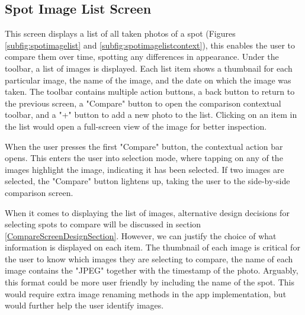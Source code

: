 \subsection{Spot Image List Screen}

This screen displays a list of all taken photos of a spot (Figures \ref{subfig:spotimagelist} and \ref{subfig:spotimagelistcontext}), this enables the user to compare them over time, spotting any differences in appearance. Under the toolbar, a list of images is displayed. Each list item shows a thumbnail for each particular image, the name of the image, and the date on which the image was taken. The toolbar contains multiple action buttons, a back button to return to the previous screen, a "Compare" button to open the comparison contextual toolbar, and a "+" button to add a new photo to the list. Clicking on an item in the list would open a full-screen view of the image for better inspection.

When the user presses the first "Compare" button, the contextual action bar opens. This enters the user into selection mode, where tapping on any of the images highlight the image, indicating it has been selected. If two images are selected, the "Compare" button lightens up, taking the user to the side-by-side comparison screen.

When it comes to displaying the list of images, alternative design decisions for selecting spots to compare will be discussed in section \ref{CompareScreenDesignSection}. However, we can justify the choice of what information is displayed on each item. The thumbnail of each image is critical for the user to know which images they are selecting to compare, the name of each image contains the "JPEG" together with the timestamp of the photo. Arguably, this format could be more user friendly by including the name of the spot. This would require extra image renaming methods in the app implementation, but would further help the user identify images.


